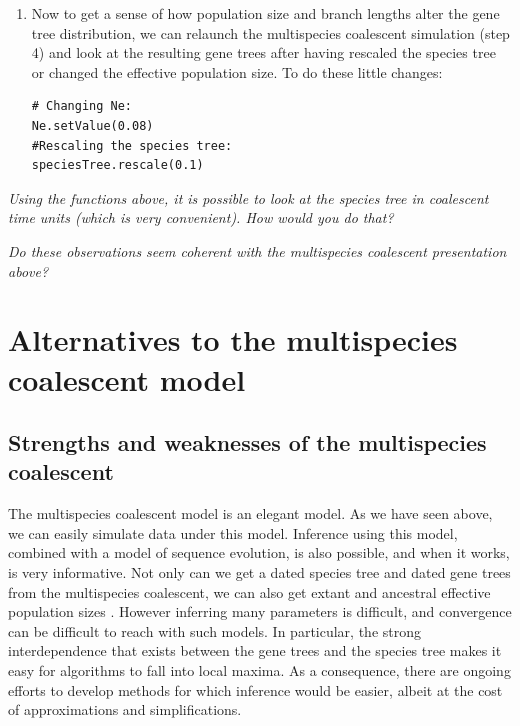 \documentclass[11pt]{article}
\begin{document}
{\begin{framed}
\begin{enumerate}
{\begin{snugshade*}
\begin{lstlisting}
#We can then use this function on our gene trees:
symDiffVector(geneTrees)
\end{lstlisting}
\end{snugshade*}}
\item Now to get a sense of how population size and branch lengths alter the gene tree distribution, we can relaunch the multispecies coalescent simulation (step 4) and look at the resulting gene trees after having rescaled the species tree or changed the effective population size. To do these little changes: 
 {\tt \begin{snugshade*}
\begin{lstlisting}
# Changing Ne: 
Ne.setValue(0.08)
#Rescaling the species tree:
speciesTree.rescale(0.1)
\end{lstlisting}
\end{snugshade*}}
\end{enumerate}
\emph{Using the functions above, it is possible to look at the species tree in coalescent time units (which is very convenient). How would you do that?}

\emph{Do these observations seem coherent with the multispecies coalescent presentation above?}
\end{framed}}



\bigskip
\section{Alternatives to the multispecies coalescent model}
\subsection{Strengths and weaknesses of the multispecies coalescent}

The multispecies coalescent model is an elegant model. 
As we have seen above, we can easily simulate data under this model.
Inference using this model, combined with a model of sequence evolution, is also possible, and when it works, is very informative.
Not only can we get a dated species tree and dated gene trees from the multispecies coalescent, we can also get extant and ancestral effective population sizes \citep{Edwards2007,Heled2010}.
However inferring many parameters is difficult, and convergence can be difficult to reach with such models.
In particular, the strong interdependence that exists between the gene trees and the species tree makes it easy for algorithms to fall into local maxima.
As a consequence, there are ongoing efforts to develop methods for which inference would be easier, albeit at the cost of approximations and simplifications.
\end{document}
